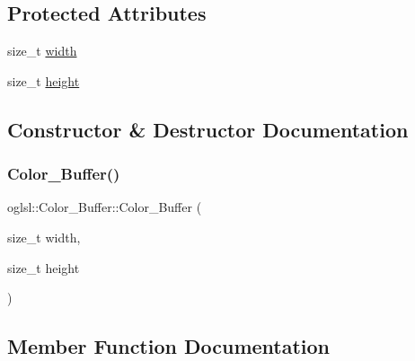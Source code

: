 \subsection*{Protected Attributes}
\begin{DoxyCompactItemize}
\item 
size\+\_\+t \mbox{\hyperlink{classoglsl_1_1_color___buffer_a520198eca2cfb64729d134d12efae304}{width}}
\item 
size\+\_\+t \mbox{\hyperlink{classoglsl_1_1_color___buffer_a18db6640d6dec54b6695821b9dcaf9c5}{height}}
\end{DoxyCompactItemize}


\subsection{Constructor \& Destructor Documentation}
\mbox{\label{classoglsl_1_1_color___buffer_aef41961965c6ee31c7948e8d917e9128}} 
\subsubsection{\texorpdfstring{Color\+\_\+\+Buffer()}{Color\_Buffer()}}
{\footnotesize\ttfamily oglsl\+::\+Color\+\_\+\+Buffer\+::\+Color\+\_\+\+Buffer (\begin{DoxyParamCaption}\item[{size\+\_\+t}]{width,  }\item[{size\+\_\+t}]{height }\end{DoxyParamCaption})\hspace{0.3cm}{\ttfamily [inline]}}



\subsection{Member Function Documentation}
\mbox{\label{classoglsl_1_1_color___buffer_a0d182abbbcfddd72467ce085b7eb88b7}} 
